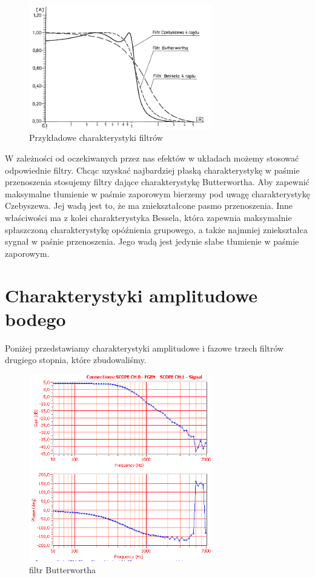 \documentclass[a4paper,11pt]{article}
\begin{document}
\begin{figure} [H]
  \begin{center}
    \includegraphics[width=8cm]{charakterystyki.png}

    \caption{ Przykładowe charakterystyki filtrów }
  \end{center}
\end{figure} 

W zależności od oczekiwanych przez nas efektów w układach możemy stosować odpowiednie filtry. 
Chcąc uzyskać najbardziej płaską charakterystykę w paśmie przenoszenia stosujemy filtry dające charakterystykę Butterwortha. Aby zapewnić maksymalne tłumienie w paśmie zaporowym bierzemy pod uwagę charakterystykę Czebyszewa. Jej wadą jest to, że ma zniekształcone pasmo przenoszenia. Inne właściwości ma z kolei charakterystyka Bessela, która zapewnia maksymalnie spłaszczoną charakterystykę opóźnienia grupowego, a także najmniej zniekształca sygnał w paśnie przenoszenia. Jego wadą jest jedynie słabe tłumienie w paśmie zaporowym.  



\section{Charakterystyki amplitudowe bodego}

Poniżej przedstawiamy charakterystyki amplitudowe i fazowe trzech filtrów drugiego stopnia, które zbudowaliśmy.

\begin{figure}[H]
\begin{center}
\includegraphics[width=8cm]{obrazki/batman1.PNG}
\end{center}
\caption{filtr Butterwortha}
\end{figure}
\end{document}
